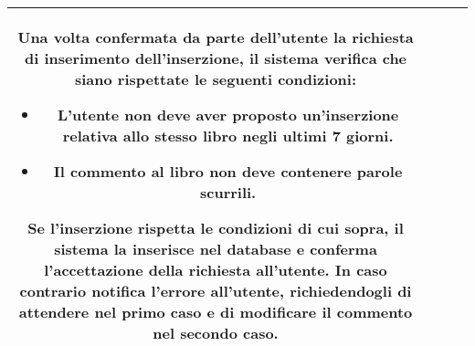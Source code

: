 \documentclass[10pt,a4paper]{book}
\begin{document}
\begin{tabular}{cp{3cm}p{9cm}p{1cm}}
\begin{enumerate}
		\end{enumerate}
		Una volta confermata da parte dell'utente la richiesta di inserimento dell'inserzione, il sistema verifica che siano rispettate le seguenti condizioni:
		\begin{itemize}
			\item L'utente non deve aver proposto un'inserzione relativa allo stesso libro negli ultimi 7 giorni.
			\item Il commento al libro non deve contenere parole scurrili.
		\end{itemize}
		Se l'inserzione rispetta le condizioni di cui sopra, il sistema la inserisce nel database e conferma l'accettazione della richiesta all'utente. In caso contrario notifica l'errore all'utente, richiedendogli di attendere nel primo caso e di modificare il commento nel secondo caso.\\ \hline
	\end{tabular}
\end{document}

